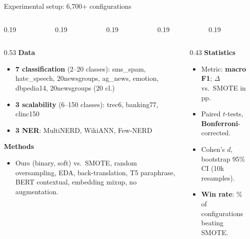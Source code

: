 
\begin{frame}{Experimental setup: 6,700+ configurations}
\begin{columns}[T,onlytextwidth]
\begin{column}{0.19\textwidth}\end{column}
\begin{column}{0.19\textwidth}\end{column}
\begin{column}{0.19\textwidth}\end{column}
\begin{column}{0.19\textwidth}\end{column}
\begin{column}{0.19\textwidth}\end{column}
\end{columns}

\vspace{0.8em}
\begin{columns}[T,onlytextwidth]
\begin{column}{0.53\textwidth}
\small
\textbf{Data} 
\begin{itemize}\setlength\itemsep{0pt}\scriptsize
  \item \textbf{7 classification} (2--20 classes): sms\_spam, hate\_speech, 20newsgroups, ag\_news, emotion, dbpedia14, 20newsgroups (20 cl.)
  \item \textbf{3 scalability} (6--150 classes): trec6, banking77, clinc150
  \item \textbf{3 NER}: MultiNERD, WikiANN, Few-NERD
\end{itemize}

\vspace{0.2em}
\textbf{Methods} 
\begin{itemize}\setlength\itemsep{0pt}\scriptsize
  \item Ours (binary, soft) vs.\ SMOTE, random oversampling, EDA, back-translation, T5 paraphrase, BERT contextual, embedding mixup, no augmentation.
\end{itemize}
\end{column}
\begin{column}{0.43\textwidth}
\small
\textbf{Statistics}
\begin{itemize}\setlength\itemsep{0pt}\scriptsize
  \item Metric: \textbf{macro F1}; $\Delta$ vs.\ SMOTE in pp.
  \item Paired $t$-tests, \textbf{Bonferroni}-corrected.
  \item Cohen's $d$, bootstrap 95\% CI (10k resamples).
  \item \textbf{Win rate}: \% of configurations beating SMOTE.
\end{itemize}


\end{column}
\end{columns}
\end{frame}

